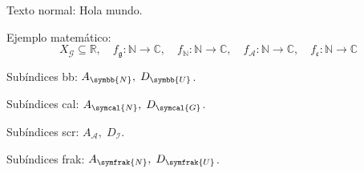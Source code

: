 \documentclass{scrartcl} %
\begin{document}
Texto normal: Hola mundo.

Ejemplo matemático:
\[
  X_{\mathcal{G}} \subseteq \mathbb{R},\quad
  f_{\mathfrak{g}} : \mathbb{N} \to \mathbb{C},\quad
  f_{\mathbb{N}} : \mathbb{N} \to \mathbb{C},\quad
  f_{\mathscr{A}} : \mathbb{N} \to \mathbb{C},\quad
  f_{\mathfrak{c}} : \mathbb{N} \to \mathbb{C}
\]

Subíndices bb: \(A_{\symbb{N}},\; D_{\symbb{U}}\).

Subíndices cal: \(A_{\symcal{N}},\; D_{\symcal{G}}\).

Subíndices scr: \(A_{\mathscr{A}},\; D_{\mathscr{I}}\).

Subíndices frak: \(A_{\symfrak{N}},\; D_{\symfrak{U}}\).
\end{document}
